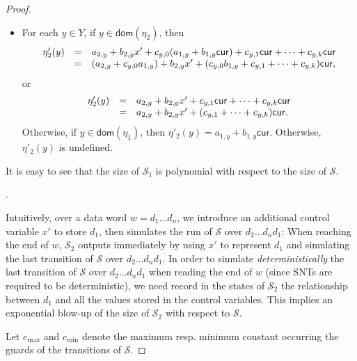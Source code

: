 \documentclass[runningheads,a4paper]{llncs}
\def\Ss{{\mathcal{S} }}
\newcommand\cur{\mathsf{cur}}
\newcommand\dom{\mathsf{dom}}
\begin{document}
\begin{appendix}
\begin{proof}
\begin{itemize}
\begin{itemize}
\begin{itemize}
%
\item For each $y \in Y$, if $y \in \dom(\eta_2)$, then 
\[
\begin{array}{l c l}
\eta'_2(y) & = & a_{2,y} + b_{2,y} x' + c_{y,0} (a_{1,y} + b_{1,y}\cur) + c_{y,1} \cur + \dots + c_{y,k} \cur \\
& = & (a_{2,y} + c_{y,0} a_{1,y}) + b_{2,y} x' + (c_{y,0} b_{1,y}  + c_{y,1} + \dots + c_{y,k} )\cur,
\end{array}
\]
or 
\[
\begin{array}{l c l}
\eta'_2(y) & = & a_{2,y} + b_{2,y} x' + c_{y,1} \cur + \dots + c_{y,k} \cur \\
& = & a_{2,y} + b_{2,y} x' + (c_{y,1} + \dots + c_{y,k} )\cur.
\end{array}
\]
%
Otherwise, if $y \in \dom(\eta_1)$, then $\eta'_2(y)= a_{1,y} + b_{1,y} \cur$. Otherwise, $\eta'_2(y)$ is undefined.
\end{itemize}
\end{itemize}
\end{itemize}
It is easy to see that the size of $\Ss_1$ is polynomial with respect to the size of $\Ss$.

\smallskip

\noindent {\it The construction of $\Ss_2$}.

Intuitively, over a data word $w=d_1\dots d_n$, we introduce an additional control variable $x'$ to store $d_1$, then simulates the run of $\Ss$ over $d_2\dots d_n d_1$: When reaching the end of $w$, $\Ss_2$ outputs immediately by using $x'$ to represent $d_1$ and simulating the last transition of $\Ss$ over $d_2 \dots d_n d_1$. In order to simulate \emph{deterministically} the last transition of $\Ss$ over $d_2 \dots d_n d_1$ when reading the end of $w$ (since SNTs are required to be deterministic), we need record in the states of $\Ss_2$ the relationship between $d_1$ and all the values stored in the control variables. This implies an exponential blow-up of the size of $\Ss_2$ with respect to $\Ss$.

Let $c_{\max}$ and $c_{\min}$ denote the maximum resp. minimum constant occurring the guards of the transitions of $\Ss$.


\end{proof}
\end{appendix}
\end{document}
